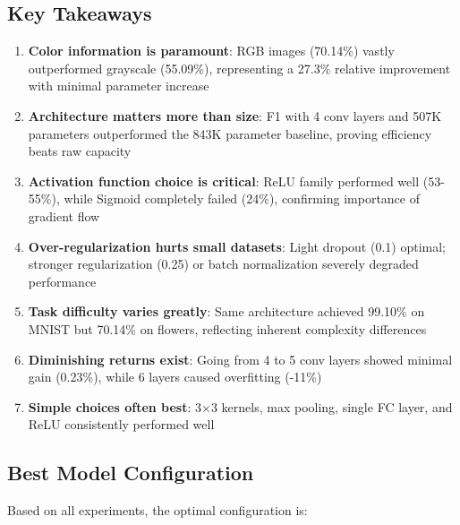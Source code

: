 \documentclass[12pt,a4paper]{article}
\begin{document}
\subsection{Key Takeaways}
\begin{enumerate}
    \item \textbf{Color information is paramount}: RGB images (70.14\%) vastly outperformed grayscale (55.09\%), representing a 27.3\% relative improvement with minimal parameter increase
    
    \item \textbf{Architecture matters more than size}: F1 with 4 conv layers and 507K parameters outperformed the 843K parameter baseline, proving efficiency beats raw capacity
    
    \item \textbf{Activation function choice is critical}: ReLU family performed well (53-55\%), while Sigmoid completely failed (24\%), confirming importance of gradient flow
    
    \item \textbf{Over-regularization hurts small datasets}: Light dropout (0.1) optimal; stronger regularization (0.25) or batch normalization severely degraded performance
    
    \item \textbf{Task difficulty varies greatly}: Same architecture achieved 99.10\% on MNIST but 70.14\% on flowers, reflecting inherent complexity differences
    
    \item \textbf{Diminishing returns exist}: Going from 4 to 5 conv layers showed minimal gain (0.23\%), while 6 layers caused overfitting (-11\%)
    
    \item \textbf{Simple choices often best}: 3×3 kernels, max pooling, single FC layer, and ReLU consistently performed well
\end{enumerate}

\subsection{Best Model Configuration}
Based on all experiments, the optimal configuration is:
\end{document}
